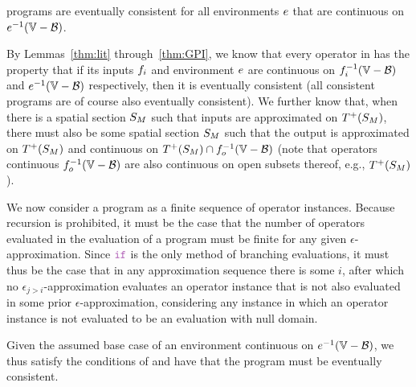 \documentclass[12pt,a4paper,twoside,openright]{book}
\begin{document}
\begin{appendices}
\begin{thm}
  \calculus{} programs are eventually consistent for all environments $e$ that are continuous on $\validdomain{\environment}$.
\end{thm}
  By Lemmas~\ref{thm:lit} through~\ref{thm:GPI}, we know that every operator in \calculus{} has the property that if its inputs $f_i$ and environment $e$ are continuous on
  $\validdomain{\field_i}$ and $\validdomain{\environment}$ respectively, then it is eventually consistent (all consistent programs are of course also eventually consistent).
  We further know that, when there is a spatial section $S_{M}$ such that inputs are approximated on $T^+({S_{M}})$, there must also be some spatial section $S_{M}$ such that the output is approximated on $T^+({S_{M}})$ and continuous on $\futureof{\sectionof{\manifold}} \cap \validdomain{\field_o}$ (note that operators continuous $\validdomain{\field_o}$ are also continuous on open subsets thereof, e.g., $T^+({S_{M}})$).

  We now consider a program as a finite sequence of operator instances.
  Because recursion is prohibited, it must be the case that the number of operators evaluated in the evaluation of a \calculus{} program must be finite for any given $\epsilon$-approximation.
  Since $\ifN$ is the only method of branching evaluations, it must thus be the case that in any approximation sequence there is some $i$, after which no $\epsilon_{j>i}$-approximation evaluates an operator instance that is not also evaluated in some prior $\epsilon$-approximation, considering any instance in which an operator instance is not evaluated to be an evaluation with null domain.  
  
  Given the assumed base case of an environment continuous on $\validdomain{\environment}$, we thus satisfy the conditions of  and have that the program must be eventually consistent.
\end{appendices}
\end{document}
